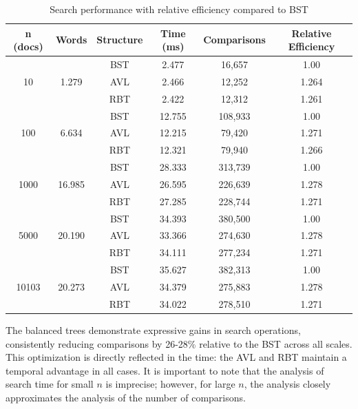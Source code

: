  \begin{table}[H]
     \centering
     \begin{tabular}{|c|c|c|c|c|c|}
     \hline
     \textbf{n (docs)} & \textbf{Words} & \textbf{Structure} & \textbf{Time (ms)} & \textbf{Comparisons} & \textbf{Relative Efficiency} \\
     \hline
     \multirow{3}{*}{10} & \multirow{3}{*}{1.279} & BST & 2.477 & 16,657 & 1.00 \\
     & & AVL & 2.466 & 12,252 & 1.264 \\
     & & RBT & 2.422 & 12,312 & 1.261 \\
     \hline
     \multirow{3}{*}{100} & \multirow{3}{*}{6.634} & BST & 12.755 & 108,933 & 1.00 \\
     & & AVL & 12.215 & 79,420 & 1.271 \\
     & & RBT & 12.321 & 79,940 & 1.266 \\
     \hline
     \multirow{3}{*}{1000} & \multirow{3}{*}{16.985} & BST & 28.333 & 313,739 & 1.00 \\
     & & AVL & 26.595 & 226,639 & 1.278 \\
     & & RBT & 27.285 & 228,744 & 1.271 \\
     \hline
     \multirow{3}{*}{5000} & \multirow{3}{*}{20.190} & BST & 34.393 & 380,500 & 1.00 \\
     & & AVL & 33.366 & 274,630 & 1.278 \\
     & & RBT & 34.111 & 277,234 & 1.271 \\
     \hline
     \multirow{3}{*}{10103} & \multirow{3}{*}{20.273} & BST & 35.627 & 382,313 & 1.00 \\
     & & AVL & 34.379 & 275,883 & 1.278 \\
     & & RBT & 34.022 & 278,510 & 1.271 \\
     \hline
     \end{tabular}
     \caption{Search performance with relative efficiency compared to BST}
     \label{tab:busca_completa}
 \end{table}


 The balanced trees demonstrate expressive gains in search operations, consistently reducing
 comparisons by 26-28\% relative to the BST across all scales. This optimization is directly reflected in the time:
 the AVL and RBT maintain a temporal advantage in all cases. It is important to note that the analysis of search time for small
 $n$ is imprecise; however, for large $n$, the analysis closely approximates the analysis of the number of comparisons.


